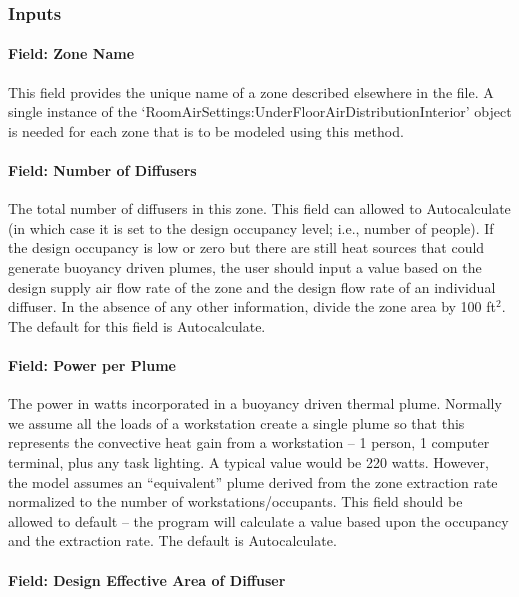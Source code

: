 \subsubsection{Inputs}\label{inputs-2016-06-17-0938}

\paragraph{Field: Zone Name}\label{field-zone-name-6-003}

This field provides the unique name of a zone described elsewhere in the file. A single instance of the `RoomAirSettings:UnderFloorAirDistributionInterior' object is needed for each zone that is to be modeled using this method.

\paragraph{Field: Number of Diffusers}\label{field-number-of-diffusers}

The total number of diffusers in this zone. This field can allowed to Autocalculate (in which case it is set to the design occupancy level; i.e., number of people). If the design occupancy is low or zero but there are still heat sources that could generate buoyancy driven plumes, the user should input a value based on the design supply air flow rate of the zone and the design flow rate of an individual diffuser. In the absence of any other information, divide the zone area by 100 ft\(^{2}\). The default for this field is Autocalculate.

\paragraph{Field: Power per Plume}\label{field-power-per-plume}

The power in watts incorporated in a buoyancy driven thermal plume. Normally we assume all the loads of a workstation create a single plume so that this represents the convective heat gain from a workstation -- 1 person, 1 computer terminal, plus any task lighting. A typical value would be 220 watts. However, the model assumes an ``equivalent'' plume derived from the zone extraction rate normalized to the number of workstations/occupants. This field should be allowed to default -- the program will calculate a value based upon the occupancy and the extraction rate. The default is Autocalculate.

\paragraph{Field: Design Effective Area of Diffuser}\label{field-design-effective-area-of-diffuser}

